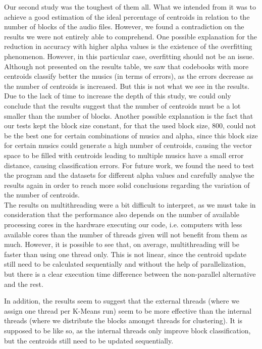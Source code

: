 \documentclass[12pt]{article}
\begin{document}
Our second study was the toughest of them all.
What we intended from it was to achieve a good estimation of the ideal percentage
of centroids in relation to the number of blocks of the audio files.
However, we found a contradiction on the results we were not entirely able to 
comprehend.
One possible explanation for the reduction in accuracy with higher alpha values
is the existence of the overfitting phenomenon. 
However, in this particular case, overfitting should not be an issue.
Although not presented on the results table, we saw that codebooks with more
centroids classify better the musics (in terms of errors), as the errors decrease
as the number of centroids is increased.
But this is not what we see in the results.
Due to the lack of time to increase the depth of this study, we could only 
conclude that the results suggest that the number of centroids must be a lot 
smaller than the number of blocks. Another possible explanation is
the fact
that our tests kept the block size constant, for that the used block
size, 800, could not be the best one for certain combinations of musics
and alpha, since this block size for certain musics
could generate a high number of centroids, causing the vector space to
be filled with centroids leading to multiple musics have a small
error distance, causing classification errors.
For future work, we found the need to test the program and the datasets for 
different alpha values and carefully analyse the results again in order to 
reach more solid conclusions regarding the variation of the number of centroids. \\

The results on multithreading were a bit difficult to interpret, as we must take 
in consideration that the performance also depends on the number of available 
processing cores in the hardware executing our code, i.e. computers with less
available cores than the number of threads given will not benefit from them as much.
However, it is possible to see that, on average, multithreading will be faster
than using one thread only.
This is not linear, since the centroid update still need to be calculated sequentially and without the help of parallelization, but
there is a clear execution time difference between the non-parallel alternative and the rest.

In addition, the results seem to suggest that the external threads (where we 
assign one thread per K-Means run) seem to be more effective than the internal
threads (where we distribute the blocks amongst threads for clustering).
It is supposed to be like so, as the internal threads only improve block 
classification, but the centroids still need to be updated sequentially.
\end{document}

